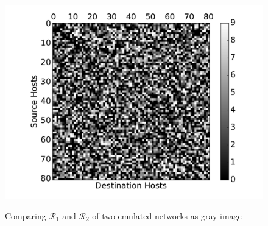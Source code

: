 \begin{figure}[t]
{                \includegraphics[scale=.42]{figures/ping_mat_4_3.pdf}
                \label{Fig:PingMatrix3}
        }
        \caption{Comparing $\mathcal{R}_1$ and $\mathcal{R}_2$ of two emulated networks as
        gray image}
        \label{Fig:ComparePingMatrix}
\end{figure}

